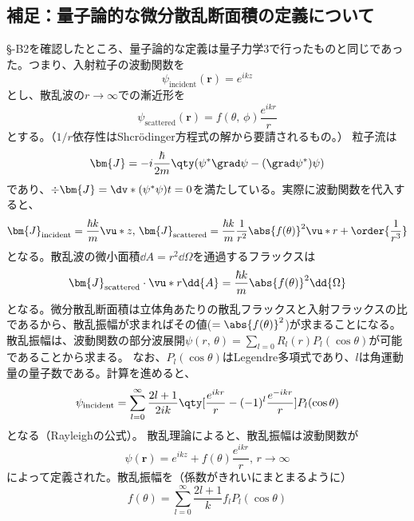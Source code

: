 \documentclass[a4paper,11pt,titlepage,uplatex]{jsarticle}
\begin{document}
\subsection{補足：量子論的な微分散乱断面積の定義について}
\S-B2を確認したところ、量子論的な定義は量子力学3で行ったものと同じであった。つまり、入射粒子の波動関数を
\begin{equation}
	\psi_{\text{incident}}(\bm{r}) = e^{ikz}
\end{equation}
とし、散乱波の$r\to\infty$での漸近形を
\begin{equation}
	\psi_{\text{scattered}}(\bm{r}) = f(\theta,\,\phi)\frac{e^{ikr}}{r}
\end{equation}
とする。（$1/r$依存性はShcr\"{o}dinger方程式の解から要請されるもの。）
粒子流は
\begin{equation}
	\bm{J} = -i\frac{\hbar}{2m}\qty(\psi^*\grad\psi - (\grad\psi^*)\psi)
\end{equation}
であり、$\div\bm{J} = \dv*{(\psi^*\psi)}{t} = 0$を満たしている。実際に波動関数を代入すると、
\begin{equation}
	\bm{J}_{\text{incident}} = \frac{\hbar k}{m}\vu*{z},\,\bm{J}_{\text{scattered}} = \frac{\hbar k}{m}\frac{1}{r^2}\abs{f(\theta)}^2\vu*{r} + \order{\frac{1}{r^3}}
\end{equation}
となる。散乱波の微小面積$\dd{A} = r^2\dd{\Omega}$を通過するフラックスは
\begin{equation}
	\bm{J}_{\text{scattered}}\cdot\vu*{r}\dd{A} = \frac{\hbar k}{m}\abs{f(\theta)}^2\dd{\Omega}
\end{equation}
となる。微分散乱断面積は立体角あたりの散乱フラックスと入射フラックスの比であるから、散乱振幅が求まればその値($=\abs{f(\theta)}^2$)が求まることになる。
散乱振幅は、波動関数の部分波展開$\psi(r,\,\theta) = \sum_{l=0}R_l(r)P_l(\cos\theta)$が可能であることから求まる。
なお、$P_l(\cos\theta)$はLegendre多項式であり、$l$は角運動量の量子数である。計算を進めると、
\begin{equation}
	\psi_{\text{incident}} = \sum_{l=0}^{\infty}\frac{2l+1}{2ik}\qty[\frac{e^{ikr}}{r}-(-1)^{l}\frac{e^{-ikr}}{r}]P_l(\cos\theta)
\end{equation}
となる（Rayleighの公式）。
散乱理論によると、散乱振幅は波動関数が
\begin{equation}
	\psi(\bm{r}) = e^{ikz} + f(\theta)\frac{e^{ikr}}{r},\,r\to\infty
\end{equation}
によって定義された。散乱振幅を（係数がきれいにまとまるように）
\begin{equation}
	f(\theta)=\sum_{l=0}^{\infty}\frac{2l+1}{k}f_lP_l(\cos\theta)
\end{equation}
\end{document}
